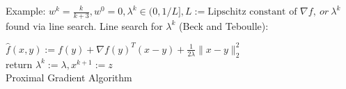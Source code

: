 \documentclass[8pt,letter]{article}
\begin{document}
\begin{multicols*}{2}
  Example: $w^k = \frac{k}{k+3}, w^0 = 0, \lambda^k \in (0,1/L], L:= \text{Lipschitz constant of }\nabla f,\ or\ \lambda^k$ found via line search.
    Line search for $\lambda^k$ (Beck and Teboulle):

    \begin{algorithm}[H]
      $\hat{f}(x,y):=f(y) + \nabla f(y)^T(x-y) + \frac{1}{2\lambda}\|x-y\|^2_2$\\
      return $\lambda^k := \lambda, x^{k+1} := z$\\
      \caption{Proximal Gradient Algorithm\label{Algo_ProximalGradient}}
    \end{algorithm}


\end{multicols*}
\end{document}

